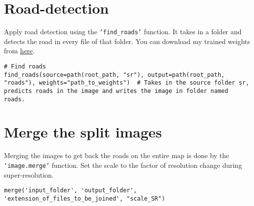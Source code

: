 \section{Road-detection}
Apply road detection using the \texttt{`find\_roads'} function. It takes in a folder and detects the road in every file of that folder. You can download my trained weights from \href{https://nautatva.github.io/btp/weight/road/}{here}.

\begin{verbatim}
# Find roads
find_roads(source=path(root_path, "sr"), output=path(root_path, "roads"), weights="path_to_weights")  # Takes in the source folder sr, predicts roads in the image and writes the image in folder named roads.
\end{verbatim}

\section{Merge the split images}
Merging the images to get back the roads on the entire map is done by the \texttt{`image.merge'} function.
Set the scale to the factor of resolution change during super-resolution.

\begin{verbatim}
merge('input_folder', 'output_folder', 'extension_of_files_to_be_joined', "scale_SR")
\end{verbatim}
